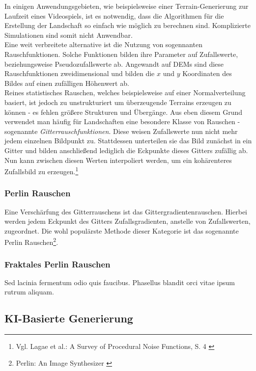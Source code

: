 In einigen Anwendungsgebieten, wie beispielsweise einer Terrain-Generierung zur Laufzeit eines Videospiels, ist es notwendig, dass die Algorithmen für die Erstellung der Landschaft so einfach wie möglich zu berechnen sind. Komplizierte Simulationen sind somit nicht Anwendbar. \\ 
Eine weit verbreitete alternative ist die Nutzung von sogennanten Rauschfunktionen. Solche Funktionen bilden ihre Parameter auf Zufallswerte, beziehungsweise Pseudozufallswerte ab. Angewandt auf DEMs sind diese Rauschfunktionen zweidimensional und bilden die $x$ und $y$ Koordinaten des Bildes auf einen zufälligen Höhenwert ab. \\ 
Reines statistisches Rauschen, welches beispielsweise auf einer Normalverteilung basiert, ist jedoch zu unstrukturiert um überzeugende Terrains erzeugen zu können - es fehlen größere Strukturen und Übergänge. Aus eben diesem Grund verwendet man häufig für Landschaften eine besondere Klasse von Rauschen - sogenannte \textit{Gitterrauschfunktionen}. Diese weisen Zufallswerte nun nicht mehr jedem einzelnen Bildpunkt zu. Stattdessen unterteilen sie das Bild zunächst in ein Gitter und bilden anschließend lediglich die Eckpunkte dieses Gitters zufällig ab. Nun kann zwischen diesen Werten interpoliert werden, um ein kohärenteres Zufallsbild zu erzeugen.\footnote{
    Vgl. Lagae et al.: A Survey of Procedural Noise Functions, S. 4
    \cite{https://doi.org/10.1111/j.1467-8659.2010.01827.x}
}  

\subsubsection{Perlin Rauschen}

Eine Verschärfung des Gitterrauschens ist das Gittergradientenrauschen. Hierbei werden jedem Eckpunkt des Gitters Zufallsgradienten, anstelle von Zufallswerten, zugeordnet. Die wohl populärste Methode dieser Kategorie ist das sogenannte Perlin Rauschen\footnote{
    Perlin: An Image Synthesizer
    \cite{perlin1985image}
}. 

\subsubsection{Fraktales Perlin Rauschen}

Sed lacinia fermentum odio quis faucibus. Phasellus blandit orci vitae ipsum rutrum aliquam. 

\subsection{KI-Basierte Generierung}


